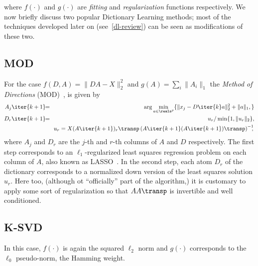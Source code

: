 \documentclass[a4paper]{IEEEtran}
\begin{document}
where $f(\cdot)$ and $g(\cdot)$ are \emph{fitting} and \emph{regularization} functions respectively. We now briefly discuss two popular Dictionary Learning methods; most of the techniques developed later on (see~\ref{dl-review}) can be seen as modifications of these two.

\subsection{MOD} For the case $f(D,A)=\|DA-X\|_2^2$ and $g(A)=\sum_{i}\|A_i\|_1$ the \emph{Method of Directions} (MOD)~\cite{mod}, is given by
\begin{eqnarray}
A_j\iter{k+1}\!\! &=&\!\! \arg\min_{a \in \reals^p} \{ \|x_j - D\iter{k}a \|_2^2 + \|a\|_1, \} \\
D_r\iter{k+1}\!\! &=&\!\! u_r/\min\{1,\|u_r\|_2\},\\
\!\!&&\!\!u_r = X(A\iter{k+1})_r\transp\left(A\iter{k+1}(A\iter{k+1})\transp\right)^{-1}\!\!\!,\,
\label{eq:mod}
\end{eqnarray}
where $A_j$ and $D_r$ are the $j$-th and $r$-th columns of $A$ and $D$ respectively. The first step corresponds to an $\ell_1$-regularized least squares regression problem on each column of $A$, also known as LASSO~\cite{lasso}.
In the second step, each atom $D_r$ of the dictionary corresponds to a normalized down version of the least squares solution $u_r$. Here too, (although ot ``officially'' part of the algorithm,) it is customary  to apply some sort of regularization so that $AA\transp$ is invertible and well conditioned.

\subsection{K-SVD} 

In this case, $f(\cdot)$ is again the squared $\ell_2$ norm and $g(\cdot)$ corresponds to the $\ell_0$ pseudo-norm, the Hamming weight. 
\end{document}
